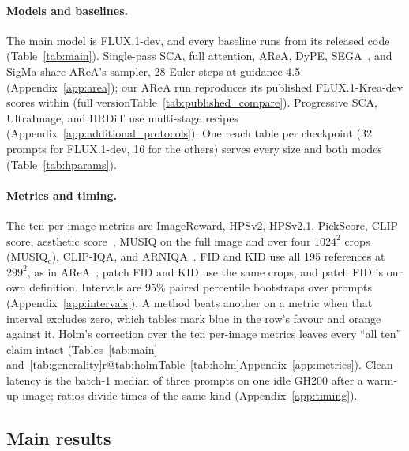 \documentclass{article} %
\makeatletter
\newcommand{\fullonly}[1]{\ifshortversion\else#1\fi}
\newcommand{\shortalt}[2]{\ifshortversion#2\else#1\fi}
\newcommand{\sca}{SCA}
\newcommand{\up}[1]{\textcolor{sigup}{#1}}
\newcommand{\dn}[1]{\textcolor{sigdn}{#1}}
\theoremstyle{remark}
\newcommand{\holmref}{\ifcsname r@tab:holm\endcsname Table~\ref{tab:holm}\else Appendix~\ref{app:metrics}\fi}
\makeatother
\begin{document}
\paragraph{Models and baselines.} The main model is FLUX.1-dev, and every baseline runs from its released code (Table~\ref{tab:main}). Single-pass \sca{}, full attention, AReA, DyPE, SEGA~\citep{rajabi2026sega}, and SigMa share AReA's sampler, 28 Euler steps at guidance 4.5 (Appendix~\ref{app:area}); our AReA run reproduces its published FLUX.1-Krea-dev scores within \hlAreaReproGap{} (\shortalt{Table~\ref{tab:published_compare}}{full version}). Progressive \sca{}, UltraImage, and HRDiT use multi-stage recipes (Appendix~\ref{app:additional_protocols}). One reach table per checkpoint (32 prompts for FLUX.1-dev, 16 for the others) serves every size and both modes\fullonly{ (Table~\ref{tab:hparams})}.

\paragraph{Metrics and timing.} The ten per-image metrics are ImageReward, HPSv2, HPSv2.1, PickScore, CLIP score, aesthetic score~\citep{xu2023imagereward,wu2023hpsv2,kirstain2023pickapic,radford2021clip,schuhmann2022aesthetic}, MUSIQ on the full image and over four $1024^2$ crops (MUSIQ$_\text{c}$), CLIP-IQA, and ARNIQA~\citep{ke2021musiq,wang2022clipiqa,agnolucci2024arniqa}. FID and KID use all 195 references at $299^2$, as in AReA~\citep{heusel2017fid}; patch FID and KID use the same crops, and patch FID is our own definition. Intervals are 95\% paired percentile bootstraps over prompts (Appendix~\ref{app:intervals}). A method beats another on a metric when that interval excludes zero, which tables mark \up{blue} in the row's favour and \dn{orange} against it. Holm's correction over the ten per-image metrics leaves every ``all ten'' claim intact (\shortalt{\holmref}{Tables~\ref{tab:main} and~\ref{tab:generality}}). Clean latency is the batch-1 median of three prompts on one idle GH200 after a warm-up image; ratios divide times of the same kind (Appendix~\ref{app:timing}).

\subsection{Main results}
\label{sec:main}
\end{document}
